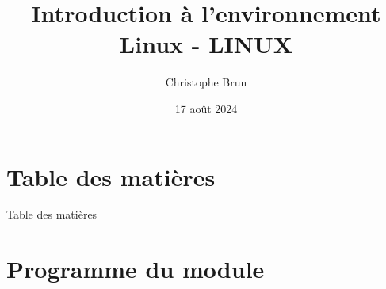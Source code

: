 \documentclass{beamer}
\title[LINUX]{Introduction à l'environnement Linux - LINUX}
\author{Christophe Brun}
\institute{Digicomp}
\date{17 août 2024}
\begin{document}
    \begin{frame}
        \titlepage
    \end{frame}


    \section{Table des matières}\label{sec:toc}

    \begin{frame}{Table des matières}
        \tableofcontents
    \end{frame}


    \section{Programme du module}\label{sec:programme-du-module}
\end{document}
